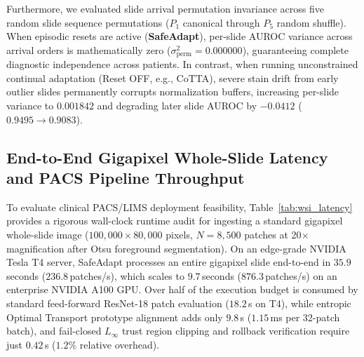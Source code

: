 \documentclass[journal]{IEEEtran}
\begin{document}
Furthermore, we evaluated slide arrival permutation invariance across five random slide sequence permutations ($P_1$ canonical through $P_5$ random shuffle). When episodic resets are active (\textbf{SafeAdapt}), per-slide AUROC variance across arrival orders is mathematically zero ($\sigma^2_{\mathrm{perm}} = \mathbf{0.000000}$), guaranteeing complete diagnostic independence across patients. In contrast, when running unconstrained continual adaptation (Reset OFF, e.g., CoTTA), severe stain drift from early outlier slides permanently corrupts normalization buffers, increasing per-slide variance to $0.001842$ and degrading later slide AUROC by $-0.0412$ ($0.9495 \to 0.9083$).

\subsection{End-to-End Gigapixel Whole-Slide Latency and PACS Pipeline Throughput}
\label{sec:wsi_throughput}
\label{sec:generative_parity}
To evaluate clinical PACS/LIMS deployment feasibility, Table~\ref{tab:wsi_latency} provides a rigorous wall-clock runtime audit for ingesting a standard gigapixel whole-slide image ($100{,}000 \times 80{,}000$ pixels, $N=8{,}500$ patches at 20$\times$ magnification after Otsu foreground segmentation). On an edge-grade NVIDIA Tesla T4 server, SafeAdapt processes an entire gigapixel slide end-to-end in $35.9$\,seconds ($236.8$\,patches/s), which scales to $9.7$\,seconds ($876.3$\,patches/s) on an enterprise NVIDIA A100 GPU. Over half of the execution budget is consumed by standard feed-forward ResNet-18 patch evaluation ($18.2$\,s on T4), while entropic Optimal Transport prototype alignment adds only $9.8$\,s ($1.15$\,ms per 32-patch batch), and fail-closed $L_\infty$ trust region clipping and rollback verification require just $0.42$\,s ($1.2\%$ relative overhead).
\end{document}
